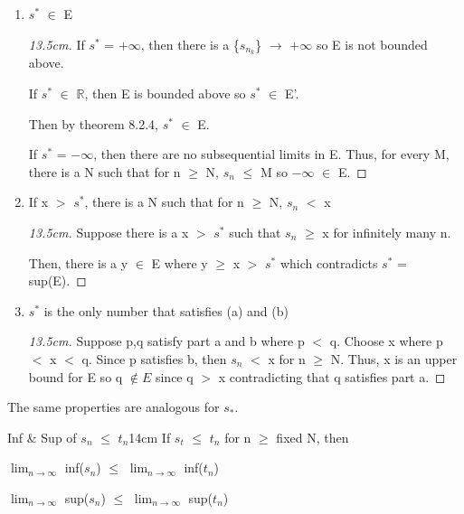 	\begin{enumerate}[label=(\alph*), leftmargin=2cm, itemsep=0.1cm]
		\item $s^*$ $\in$ E

			\begin{proof}[13.5cm]
				If $s^*$ = $+\infty$, then there is a
				\{$s_{n_k}$\} $\rightarrow$ $+\infty$ so E is not bounded above.
				
				If $s^*$ $\in$ $\mathbb{R}$, then E is bounded above so
				$s^*$ $\in$ E'.

				Then by {\color{red} theorem 8.2.4}, $s^*$ $\in$ E.

				If $s^*$ = $-\infty$, then there are no subsequential limits
				in E.
				Thus, for every M, there is a N such that for n $\geq$ N,
				$s_n$ $\leq$ M so $-\infty$ $\in$ E.				
			\end{proof}

		\item If x $>$ $s^*$, there is a N such that for n $\geq$ N, $s_n$ $<$ x
		
			\begin{proof}[13.5cm]
				Suppose there is a x $>$ $s^*$ such that $s_n$ $\geq$ x
				for infinitely many n.

				Then, there is a y $\in$ E where y $\geq$ x $>$ $s^*$
				which contradicts $s^*$ = sup(E).
			\end{proof}

		\item $s^*$ is the only number that satisfies (a) and (b)
		
			\begin{proof}[13.5cm]
				Suppose p,q satisfy part a and b where p $<$ q.
				Choose x where p $<$ x $<$ q.
				Since p satisfies b, then $s_n$ $<$ x for n $\geq$ N.
				Thus, x is an upper bound for E so q $\not \in E$ since q $>$ x
				contradicting that q satisfies part a.
			\end{proof}
	\end{enumerate}

	\hspace{1cm}
	The same properties are analogous for $s_*$.

	\newpage



	\begin{wtheorem}{Inf \& Sup of $s_n$ $\leq$ $t_n$}{14cm}
		If $s_t$ $\leq$ $t_n$ for n $\geq$ fixed N, then

		\hspace{0.5cm}
		$\lim_{n \rightarrow \infty}$ inf($s_n$)
		$\leq$
		$\lim_{n \rightarrow \infty}$ inf($t_n$)

		\hspace{0.5cm}
		$\lim_{n \rightarrow \infty}$ sup($s_n$)
		$\leq$
		$\lim_{n \rightarrow \infty}$ sup($t_n$)
	\end{wtheorem}

